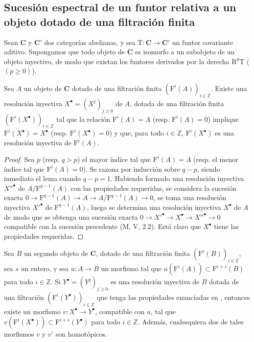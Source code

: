 \subsection{Sucesión espectral de un funtor relativa a un objeto dotado de una filtración finita}
\label{subsection:0.13.6}
\label{subsection:0.13.6-fr}

\begin{env}[13.6.1]
\label{0.13.6.1}
\label{0.13.6.1-fr}
Sean $\boldsymbol{C}$ y $\boldsymbol{C}'$ dos categorías abelianas, y sea
$\mathrm T:\boldsymbol{C}\to \boldsymbol{C}'$ un funtor covariante
aditivo.
Supongamos que todo objeto de $\boldsymbol{C}$ es isomorfo a un subobjeto de
un objeto inyectivo, de modo que existan los funtores derivados por la derecha
$\mathrm R^p\mathrm T$ ($(p\geq0)$).
\end{env}

\begin{lemma}[13.6.2]
\label{0.13.6.2}
\label{0.13.6.2-fr}
Sea $A$ un objeto de $\boldsymbol{C}$ dotado de una filtración \textup{finita}
$(\mathrm F^i(A))_{i\in\mathbb Z}$.
Existe una resolución inyectiva
$X^\bullet=(X^j)_{j\geq0}$ de $A$, dotada de una filtración finita
$(\mathrm F^i(X^\bullet))_{i\in\mathbb Z}$ tal que la relación $\mathrm F^i(A)=A$ \textup{(resp. $\mathrm F^i(A)=0$)} implique $\mathrm F^i(X^\bullet)=X^\bullet$ \textup{(resp. $\mathrm F^i(X^\bullet)=0$)} y que, para todo $i\in\mathbb Z$,
$\mathrm F^i(X^\bullet)$ es una resolución inyectiva de
$\mathrm F^i(A)$.
\end{lemma}

\begin{proof}
Sea $p$ (resp. $q>p$) el mayor índice tal que
$\mathrm F^i(A)=A$ (resp. el menor índice tal que
$\mathrm F^i(A)=0$).
Se razona por inducción sobre $q-p$, siendo inmediato el lema cuando
$q-p=1$. Habiendo formado una resolución inyectiva ${X''}^\bullet$ de
$A/\mathrm F^{q-1}(A)$ con las propiedades requeridas, se considera la sucesión exacta $0\to\mathrm F^{q-1}(A)\to A\to A/\mathrm F^{q-1}(A)\to0$, se toma una resolución inyectiva ${X'}^\bullet$ de
$\mathrm F^{q-1}(A)$, luego se determina una resolución inyectiva $X^\bullet$ de $A$ de modo que se obtenga una sucesión exacta
$0\to {X'}^\bullet\to X^\bullet\to {X''}^\bullet\to0$
compatible con la sucesión precedente (M, V, 2.2).
Está claro que $X^\bullet$ tiene las propiedades requeridas.
\end{proof}

\begin{corollary}[13.6.3]
\label{0.13.6.3}
\label{0.13.6.3-fr}
Sea $B$ un segundo objeto de $\boldsymbol{C}$, dotado de una filtración
finita $(\mathrm F^i(B))_{i\in\mathbb Z}$, sea $s$ un entero,
y sea $u:A\to B$ un morfismo tal que
$u(\mathrm F^i(A))\subset\mathrm F^{i+s}(B)$
para todo $i\in\mathbb Z$.
Si $Y^\bullet=(Y^j)_{j\geq0}$ es una resolución inyectiva de $B$
dotada de una filtración
$(\mathrm F^i(Y^\bullet))_{i\in\mathbb Z}$ que tenga las propiedades
enunciadas en , entonces existe un morfismo
$v:X^\bullet\to Y^\bullet$, compatible con $u$, tal
que
$v(\mathrm F^i(X^\bullet))\subset\mathrm F^{i+s}(Y^\bullet)$
para todo $i\in\mathbb Z$.
Además, cualesquiera dos de tales morfismos $v$ y $v'$ son homotópicos.
\end{corollary}

